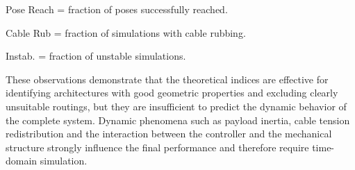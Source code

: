 \begin{table}[htbp]
\centering
\begin{threeparttable}
\caption{Static and dynamic performance indices for the candidate architectures. Rankings (1 = best) are reported separately for each metric.}
\label{tab:architecture_ranking}
\begin{tablenotes}
\footnotesize
\item Pose Reach = fraction of poses successfully reached.
\item Cable Rub = fraction of simulations with cable rubbing.
\item Instab. = fraction of unstable simulations.
\end{tablenotes}
\end{threeparttable}
\end{table}

These observations demonstrate that the theoretical indices are effective for identifying architectures with good geometric properties and excluding clearly unsuitable routings, but they are insufficient to predict the dynamic behavior of the complete system. Dynamic phenomena such as payload inertia, cable tension redistribution and the interaction between the controller and the mechanical structure strongly influence the final performance and therefore require time-domain simulation.

